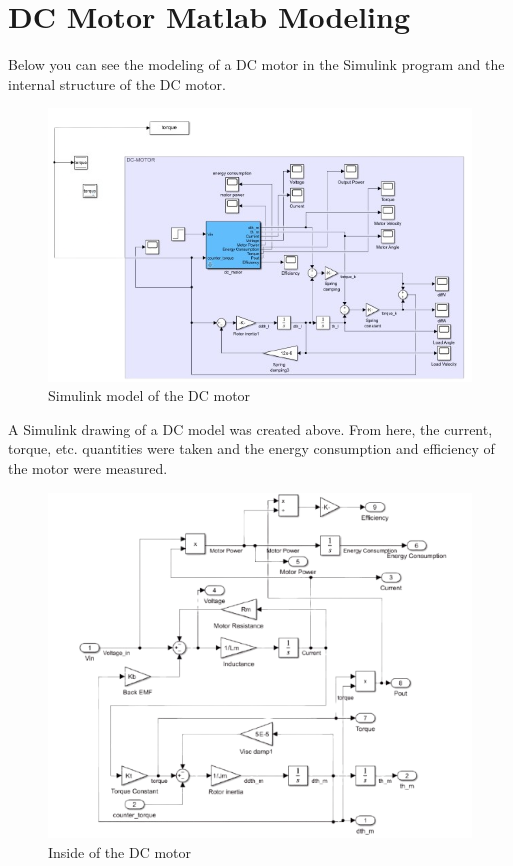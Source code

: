 \doublespacing %

\chapter{DC Motor Matlab Modeling}

\thesisspacing %

Below you can see the modeling of a DC motor in the Simulink program and the internal structure of the DC motor.

\begin{figure}[H]
    \centering
    \includegraphics[width=0.9\columnwidth]{imgs/io/dc1.png}
    \caption[Simulink model of the DC motor]{Simulink model of the DC motor}
    \label{fig-magnitude}
\end{figure}%

A Simulink drawing of a DC model was created above. From here, the current, torque, etc. quantities were taken and the energy consumption and efficiency of the motor were measured.

\begin{figure}[h]
        \centering
        \includegraphics[width=0.9\columnwidth]{imgs/io/dc2.png}
        \caption[Inside of the DC motor]{Inside of the DC motor}
        \label{fig-magnitude}
\end{figure}%

